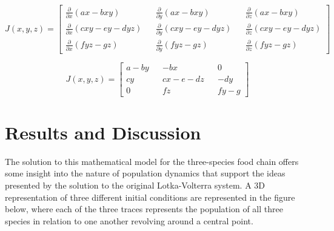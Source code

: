 \documentclass[11pt,oneside]{article}
\begin{document}
	\begin{equation}
	J(x,y,z) = 
	\begin{bmatrix}
	\frac{\partial}{\partial x}(ax - bxy) && \frac{\partial}{\partial y}(ax - bxy) && \frac{\partial}{\partial z}(ax - bxy) \\
	\frac{\partial}{\partial x}(cxy - ey - dyz) && \frac{\partial}{\partial y}(cxy - ey - dyz) && \frac{\partial}{\partial z}(cxy - ey - dyz) \\
	\frac{\partial}{\partial x}(fyz - gz) && \frac{\partial}{\partial y}(fyz - gz) && \frac{\partial}{\partial z}(fyz - gz)
	\end{bmatrix}
	\end{equation}
	
	\begin{equation}
	J(x,y,z) = 
	\begin{bmatrix}
	a - by && - bx && 0 \\
	cy && cx - e - dz && -dy \\
	0 && fz && fy - g
	\end{bmatrix}
	\end{equation}
	
	\section{Results and Discussion}
	The solution to this mathematical model for the three-species food chain offers some insight into the nature of population dynamics that support the ideas presented by the solution to the original Lotka-Volterra system. A 3D representation of  three different initial conditions are represented in the figure below, where each of the three traces represents the population of all three species in relation to one another revolving around a central point.
	
\end{document}
